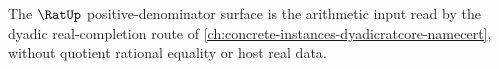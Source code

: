 

The $\RatUp$ positive-denominator surface is the arithmetic input read by the dyadic real-completion route of \autoref{ch:concrete-instances-dyadicratcore-namecert}, without quotient rational equality or host real data.


